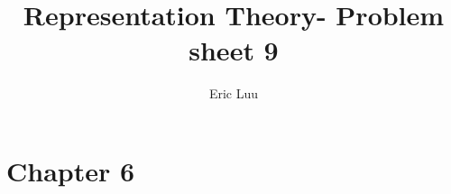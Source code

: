 \documentclass[]{article}
\title{Representation Theory- Problem sheet 9}
\author{Eric Luu}
\begin{document}
\maketitle

\section*{Chapter 6}
\end{document}

